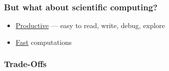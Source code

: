 \begin{frame}[fragile]
    \frametitle{But what about scientific computing?}
    

    \begin{itemize}
        \item \underline{Productive} --- easy to read, write, debug, explore
            \vspace{0.4em}
            \vspace{0.4em}
            \vspace{0.4em}
        \item \underline{Fast} computations
    \end{itemize}

\end{frame}




\begin{frame}
    \frametitle{Trade-Offs}

    \begin{figure}
       \begin{center}
       \end{center}
    \end{figure}

\end{frame}


